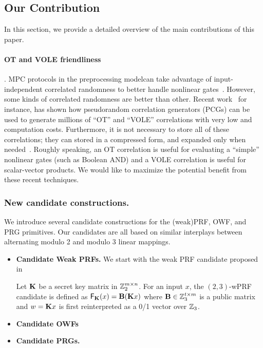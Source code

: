 \subsection{Our Contribution}



In this section, we provide a detailed overview of the main contributions of this paper.


\paragraph{\bf \textnormal{OT} and \textnormal{VOLE} friendliness}.
    MPC protocols in the preprocessing modelcan take advantage of input-independent correlated randomness to better handle nonlinear gates~\cite{Beaver,BDOZ,SPDZ,PowerOfCorrelatedRandomness,TinyTables,BGI19}. However, some kinds of correlated randomness are better than other. Recent work~\cite{?} for instance, has shown how pseudorandom correlation generators (PCGs) can be used to generate millions of ``OT'' and ``VOLE'' correlations with very low and computation costs. Furthermore, it is not necessary to store all of these correlations; they can stored in a compressed form, and expanded only when needed~\cite{?}. Roughly speaking, an OT correlation is useful for evaluating a ``simple'' nonlinear gates (such as Boolean AND) and a VOLE correlation is useful for scalar-vector products. We would like to maximize the potential benefit from these recent techniques.





\subsubsection{New candidate constructions.}
We introduce several candidate constructions for the (weak)PRF, OWF, and PRG primitives. Our candidates are all based on similar interplays between alternating modulo 2 and modulo 3 linear mappings.

\begin{itemize}
    \item \textbf{Candidate Weak PRFs.}
    We start with the weak PRF candidate proposed in~\cite{boneh2018-darkmatter}

    Let $\mat{K}$ be a secret key matrix in $\mathbb{Z}_2^{m \times n}$. For an input $x$, the $(2,3)$-wPRF candidate is defined as $\mathsf{F}_\mat{K}(x) = \mat{B}(\mat{K}x)$ where $\mat{B} \in \Z_3^{t \times m}$ is a public matrix and $w = \mat{K}x$ is first reinterpreted as a 0/1 vector over $\mathbb{Z}_3$.


    \item \textbf{Candidate OWFs}

    \item \textbf{Candidate PRGs.}

\end{itemize}

